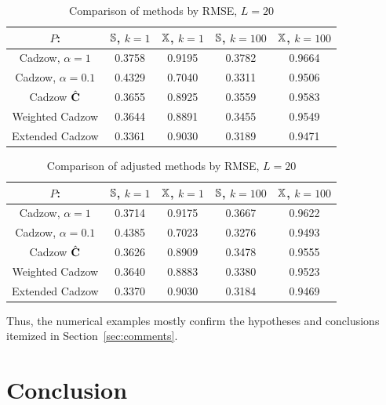 \documentclass[sii]{ipart}
\begin{document}
\begin{table}
		\caption{Comparison of methods by RMSE, $L = 20$}\label{fintable}

		\begin{tabular*}{\textwidth}{@{\extracolsep{\fill}}ccccc}
			\hline
			$P$: & $\mathbb{S}$, $k = 1$ & $\mathbb{X}$, $k = 1$ & $\mathbb{S}$, $k = 100$ & $\mathbb{X}$, $k = 100$  \\
			\hline
			Cadzow, $\alpha = 1$ & 0.3758 & 0.9195 & 0.3782 & 0.9664 \\
			\hline
			Cadzow, $\alpha = 0.1$ & 0.4329 & 0.7040 & 0.3311 & 0.9506 \\
			\hline
			Cadzow $\hat{\mathbf{C}}$ & 0.3655 & 0.8925 & 0.3559 & 0.9583 \\
			\hline
			Weighted Cadzow & 0.3644 & 0.8891 & 0.3455 & 0.9549 \\
			\hline
			Extended Cadzow & 0.3361 & 0.9030 & 0.3189 & 0.9471 \\
			\hline
		\end{tabular*}
\end{table}

\begin{table}
	\begin{center}
		\caption{Comparison of adjusted methods by RMSE, $L = 20$}\label{fintable_improved}
		\begin{tabular*}{\textwidth}{@{\extracolsep{\fill}}ccccc}
			\hline
			$P$: & $\mathbb{S}$, $k = 1$ & $\mathbb{X}$, $k = 1$ & $\mathbb{S}$, $k = 100$ & $\mathbb{X}$, $k = 100$  \\
			\hline
			Cadzow, $\alpha = 1$ & 0.3714 & 0.9175 & 0.3667 & 0.9622 \\
			\hline
			Cadzow, $\alpha = 0.1$ & 0.4385 & 0.7023 & 0.3276 & 0.9493 \\
			\hline
			Cadzow $\hat{\mathbf{C}}$ & 0.3626 & 0.8909 & 0.3478 & 0.9555 \\
			\hline
			Weighted Cadzow & 0.3640 & 0.8883 & 0.3380 & 0.9523 \\
			\hline
			Extended Cadzow & 0.3370 & 0.9030 & 0.3184 & 0.9469 \\
			\hline
		\end{tabular*}
	\end{center}
\end{table}

Thus, the numerical examples mostly confirm the hypotheses and conclusions itemized in Section~\ref{sec:comments}.

\section{Conclusion}
\label{sec:concl}
%
%
\end{document}
